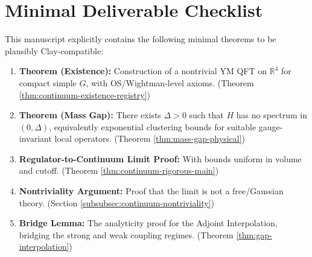 \section{Minimal Deliverable Checklist}

This manuscript explicitly contains the following minimal theorems to be plausibly Clay-compatible:

\begin{enumerate}
    \item \textbf{Theorem (Existence):} Construction of a nontrivial YM QFT on $\mathbb{R}^4$ for compact simple $G$, with OS/Wightman-level axioms. (Theorem \ref{thm:continuum-existence-registry})
    \item \textbf{Theorem (Mass Gap):} There exists $\Delta > 0$ such that $H$ has no spectrum in $(0, \Delta)$, equivalently exponential clustering bounds for suitable gauge-invariant local operators. (Theorem \ref{thm:mass-gap-physical})
    \item \textbf{Regulator-to-Continuum Limit Proof:} With bounds uniform in volume and cutoff. (Theorem \ref{thm:continuum-rigorous-main})
    \item \textbf{Nontriviality Argument:} Proof that the limit is not a free/Gaussian theory. (Section \ref{subsubsec:continuum-nontriviality})
    \item \textbf{Bridge Lemma:} The analyticity proof for the Adjoint Interpolation, bridging the strong and weak coupling regimes. (Theorem \ref{thm:gap-interpolation})
\end{enumerate}
